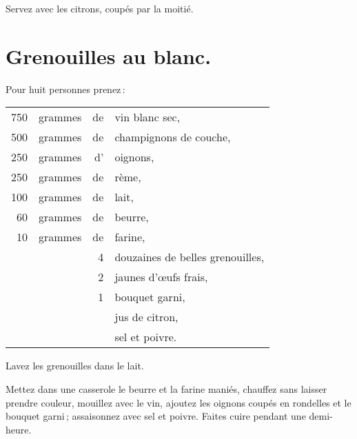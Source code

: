 Servez avec les citrons, coupés par la moitié.

\section*{\centering Grenouilles au blanc.}

Pour huit personnes prenez :

\medskip

\footnotesize
\begin{longtable}{rrrp{16em}}
  750 & grammes   & de & vin blanc sec,                                                                   \\
  500 & grammes   & de & champignons de couche,                                                           \\
  250 & grammes   & d' & oignons,                                                                         \\
  250 & grammes   & de & rème,                                                                            \\
  100 & grammes   & de & lait,                                                                            \\
   60 & grammes   & de & beurre,                                                                          \\
   10 & grammes   & de & farine,                                                                          \\
      &           &  4 & douzaines de belles grenouilles,                                                 \\
      &           &  2 & jaunes d'œufs frais,                                                             \\
      &           &  1 & bouquet garni,                                                                   \\
      &           &    & jus de citron,                                                                   \\
      &           &    & sel et poivre.                                                                   \\
\end{longtable}
\normalsize

Lavez les grenouilles dans le lait.

Mettez dans une casserole le beurre et la farine maniés, chauffez sans laisser
prendre couleur, mouillez avec le vin, ajoutez les oignons coupés en rondelles
et le bouquet garni ; assaisonnez avec sel et poivre. Faites cuire pendant une
demi-heure.

